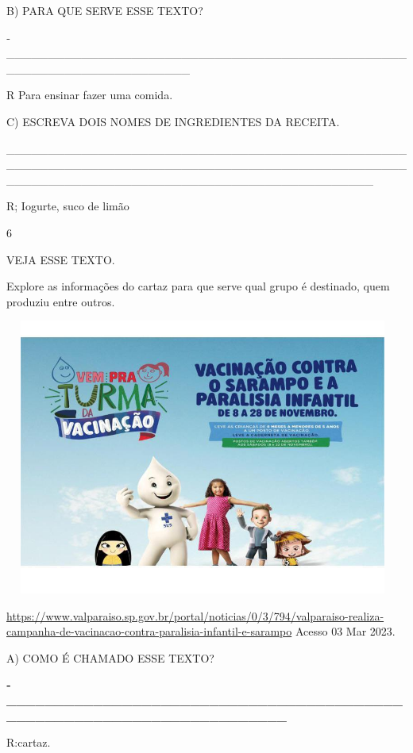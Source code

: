 {{B) PARA QUE SERVE ESSE TEXTO?

­­­­­­­­­­­­­­­­­­­­­­­­­­­­­­­­­­­­­­­­­­­­­­­­­­­­\_\_\_\_\_\_\_\_\_\_\_\_\_\_\_\_\_\_\_\_\_\_\_\_\_\_\_\_\_\_\_\_\_\_\_\_\_\_\_\_\_\_\_\_\_\_\_\_\_\_\_\_\_\_\_\_\_\_\_\_\_\_\_\_\_\_\_\_\_\_

R Para ensinar fazer uma comida.

C) ESCREVA DOIS NOMES DE INGREDIENTES DA RECEITA.

\_\_\_\_\_\_\_\_\_\_\_\_\_\_\_\_\_\_\_\_\_\_\_\_\_\_\_\_\_\_\_\_\_\_\_\_\_\_\_\_\_\_\_\_\_\_\_\_\_\_\_\_\_\_\_\_\_\_\_\_\_\_\_\_\_\_\_\_\_\_\_\_\_\_\_\_\_\_\_\_\_\_\_\_\_\_\_\_\_\_\_\_\_\_\_\_\_\_\_\_\_\_\_\_\_\_\_\_\_\_\_\_\_\_\_\_\_\_\_\_\_\_\_\_\_\_\_\_\_\_\_\_\_\_\_\_\_\_\_\_

R; Iogurte, suco de limão

\num{6}

VEJA ESSE TEXTO.

Explore as informações do cartaz para que serve qual grupo é destinado,
quem produziu entre outros.

\includegraphics[width=5.14861in,height=3.58125in]{media/image107.jpeg}

\url{https://www.valparaiso.sp.gov.br/portal/noticias/0/3/794/valparaiso-realiza-campanha-de-vacinacao-contra-paralisia-infantil-e-sarampo}
Acesso 03 Mar 2023.

A) COMO É CHAMADO ESSE TEXTO?

\textbf{­­­­­­­­­­­­­­­­­­­­­\_\_\_\_\_\_\_\_\_\_\_\_\_\_\_\_\_\_\_\_\_\_\_\_\_\_\_\_\_\_\_\_\_\_\_\_\_\_\_\_\_\_\_\_\_\_\_\_\_\_\_\_\_\_\_\_\_\_\_\_\_\_\_\_\_\_\_\_\_\_}

R:cartaz.

}}
